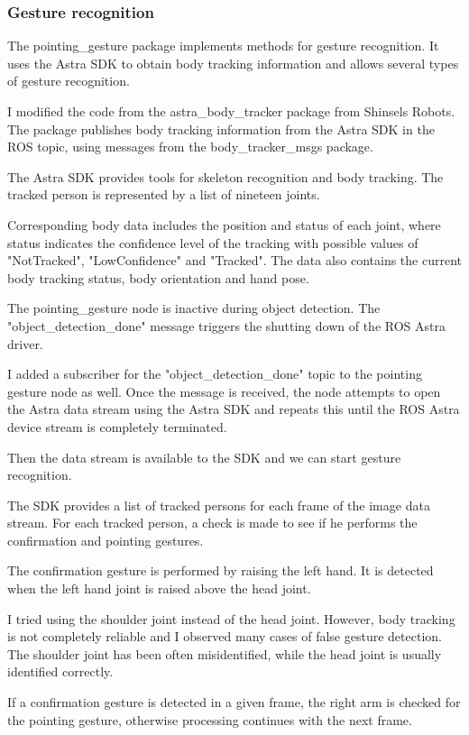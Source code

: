 \subsubsection{Gesture recognition}
The pointing\_gesture package implements methods for gesture recognition. It uses the Astra SDK to obtain body tracking information and allows several types of gesture recognition.\par
I modified the code from the astra\_body\_tracker package from Shinsels Robots. The package publishes body tracking information from the Astra SDK in the ROS topic, using messages from the body\_tracker\_msgs package.\par
The Astra SDK provides tools for skeleton recognition and body tracking. The tracked person is represented by a list of nineteen joints.\par
Corresponding body data includes the position and status of each joint, where status indicates the confidence level of the tracking with possible values of "NotTracked", "LowConfidence" and "Tracked".
The data also contains the current body tracking status, body orientation and hand pose.\par
The pointing\_gesture node is inactive during object detection. 
The "object\_detection\_done" message triggers the shutting down of the ROS Astra driver.\par
I added a subscriber for the "object\_detection\_done" topic to the pointing gesture node as well. Once the message is received, the node attempts to open the Astra data stream using the Astra SDK and repeats this until the ROS Astra device stream is completely terminated.\par
Then the data stream is available to the SDK and we can start gesture recognition.\par 
The SDK provides a list of tracked persons for each frame of the image data stream. For each tracked person, a check is made to see if he performs the confirmation and pointing gestures.\par
The confirmation gesture is performed by raising the left hand. It is detected when the left hand joint is raised above the head joint.\par
I tried using the shoulder joint instead of the head joint. However, body tracking is not completely reliable and I observed many cases of false gesture detection. The shoulder joint has been often misidentified, while the head joint is usually identified correctly.\par
If a confirmation gesture is detected in a given frame, the right arm is checked for the pointing gesture, otherwise processing continues with the next frame.\par
